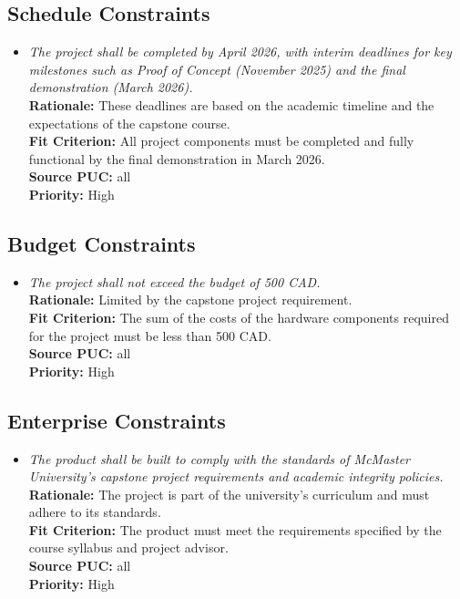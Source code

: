 \documentclass[12pt]{article}
\begin{document}
\subsection{Schedule Constraints}

\begin{itemize}[leftmargin=*]
  \item[SHC-1] \emph{The project shall be completed by April 2026, with interim
          deadlines for key milestones such as Proof of Concept (November 2025) and the
          final demonstration (March 2026).}\\[2mm]
        \textbf{Rationale:} These deadlines are based on the academic timeline and the expectations of the capstone course.\\
        \textbf{Fit Criterion:} All project components must be completed and fully functional by the final demonstration in March 2026.\\
        \textbf{Source PUC:} all\\
        \textbf{Priority:} High
\end{itemize}

\subsection{Budget Constraints}

\begin{itemize}[leftmargin=*]
  \item[BC-1] \emph{The project shall not exceed the budget of 500 CAD.}\\[2mm]
        \textbf{Rationale:} Limited by the capstone project requirement.\\
        \textbf{Fit Criterion:} The sum of the costs of the hardware components required for the project must be less than 500 CAD.\\
        \textbf{Source PUC:} all\\
        \textbf{Priority:} High
\end{itemize}

\subsection{Enterprise Constraints}

\begin{itemize}[leftmargin=*]
  \item[EC-1] \emph{The product shall be built to comply with the standards of McMaster
          University's capstone project requirements and academic integrity policies.}\\[2mm]
        \textbf{Rationale:} The project is part of the university's curriculum and must adhere to its standards.\\
        \textbf{Fit Criterion:} The product must meet the requirements specified by the course syllabus and project advisor.\\
        \textbf{Source PUC:} all\\
        \textbf{Priority:} High
\end{itemize}
\end{document}
